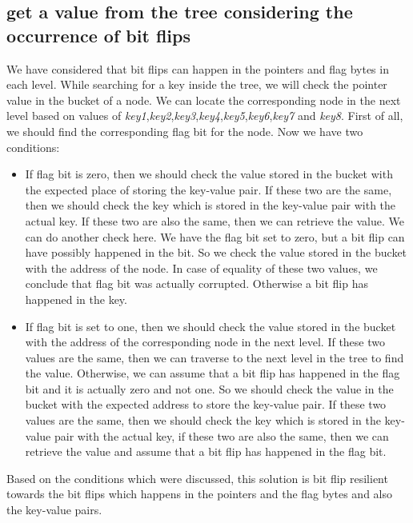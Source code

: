 \documentclass{report}
\begin{document}
\subsection{get a value from the tree considering the occurrence of bit flips }

We have considered that bit flips can happen in the pointers and flag bytes in each level. While searching for a key inside the tree, we will check the pointer value in the bucket of a node. We can locate the corresponding node in the next level based on values of \textit{key1},\textit{key2},\textit{key3},\textit{key4},\textit{key5},\textit{key6},\textit{key7} and \textit{key8}. First of all, we should find the corresponding flag bit for the node. Now we have two conditions:

\begin{itemize}

\item If flag bit is zero, then we should check the value stored in the bucket with the expected place of storing the key-value pair. If these two are the same, then we should check the key which is stored in the key-value pair with the actual key. If these two are also the same, then we can retrieve the value. We can do another check here. We have the flag bit set to zero, but a bit flip can have possibly happened in the bit. So we check the value stored in the bucket with the address of the node. In case of equality of these two values, we conclude that flag bit was actually corrupted. Otherwise a bit flip has happened in the key. 

\item If flag bit is set to one, then we should check the value stored in the bucket with the address of the corresponding node in the next level. If these two values are the same, then we can traverse to the next level in the tree to find the value. Otherwise, we can assume that a bit flip has happened in the flag bit and it is actually zero and not one. So we should check the value in the bucket with the expected address to store the key-value pair. If these two values are the same, then we should check the key which is stored in the key-value pair with the actual key, if these two are also the same, then we can retrieve the value and assume that a bit flip has happened in the flag bit.  
\end{itemize}

Based on the conditions which were discussed, this solution is bit flip resilient towards the bit flips which happens in the pointers and the flag bytes and also the key-value pairs.
\end{document}
